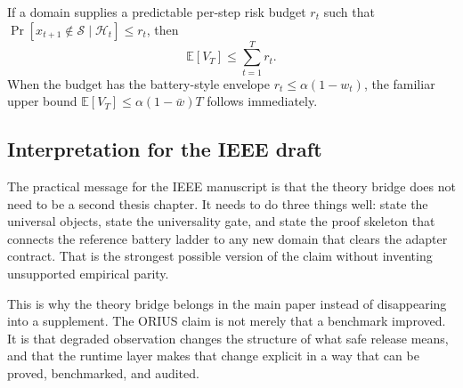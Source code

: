\begin{corollary}
\label{cor:prof-episode-aggregation}
If a domain supplies a predictable per-step risk budget \(r_t\) such that
\(\Pr[x_{t+1}\notin\mathcal{S}\mid\mathcal{H}_t]\le r_t\), then
\[
  \mathbb{E}[V_T]\le \sum_{t=1}^T r_t.
\]
When the budget has the battery-style envelope \(r_t\le \alpha(1-w_t)\), the familiar
upper bound \(\mathbb{E}[V_T]\le \alpha(1-\bar{w})T\) follows immediately.
\end{corollary}

\subsection{Interpretation for the IEEE draft}
The practical message for the IEEE manuscript is that the theory bridge does not need to
be a second thesis chapter.  It needs to do three things well: state the universal
objects, state the universality gate, and state the proof skeleton that connects the
reference battery ladder to any new domain that clears the adapter contract.  That is the
strongest possible version of the claim without inventing unsupported empirical parity.

This is why the theory bridge belongs in the main paper instead of disappearing into a
supplement. The ORIUS claim is not merely that a benchmark improved. It is that
degraded observation changes the structure of what safe release means, and that the
runtime layer makes that change explicit in a way that can be proved, benchmarked, and
audited.
